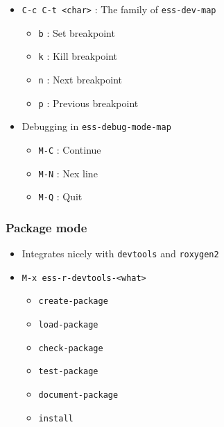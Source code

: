 \documentclass[11pt]{article}
\begin{document}
\begin{itemize}
\item \texttt{C-c C-t <char>} : The family of \texttt{ess-dev-map}

\begin{itemize}
\item \texttt{b} : Set breakpoint

\item \texttt{k} : Kill breakpoint

\item \texttt{n} : Next breakpoint

\item \texttt{p} : Previous breakpoint
\end{itemize}

\item Debugging in \texttt{ess-debug-mode-map}

\begin{itemize}
\item \texttt{M-C} : Continue

\item \texttt{M-N} : Nex line

\item \texttt{M-Q} : Quit
\end{itemize}
\end{itemize}

\subsubsection{Package mode}
\label{sec:org0888adf}

\begin{itemize}
\item Integrates nicely with \texttt{devtools} and \texttt{roxygen2}

\item \texttt{M-x ess-r-devtools-<what>}

\begin{itemize}
\item \texttt{create-package}

\item \texttt{load-package}

\item \texttt{check-package}

\item \texttt{test-package}

\item \texttt{document-package}

\item \texttt{install}
\end{itemize}
\end{itemize}
\end{document}
